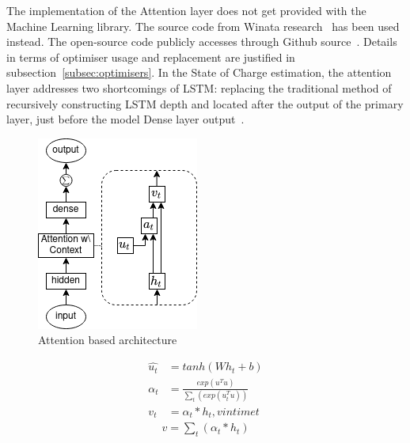 %
%
The implementation of the Attention layer does not get provided with the Machine Learning library.
The source code from Winata research~\cite{winata_attention-based_2018} has been used instead.
The open-source code publicly accesses through Github source~\cite{attention_8461990}.
Details in terms of optimiser usage and replacement are justified in subsection~\ref{subsec:optimisers}.
In the State of Charge estimation, the attention layer addresses two shortcomings of LSTM: replacing the traditional method of recursively constructing LSTM depth and located after the output of the primary layer, just before the model Dense layer output~\cite{mamo_long_2020}.
\begin{figure}[htbp]
    \centering
    \includegraphics[width=0.35\linewidth]{II_Body/LSTM/images/AttenrionDrawing.png}
    \caption{Attention based architecture}
    \label{fig:attention}
\end{figure}
\begin{equation}
    \begin{split}
        \hat{u_t} &= tanh \left(W h_{t} + b \right) \\
             \alpha_t &= \frac{exp(u^T u)}{\sum_t(exp(u_t^T u))} \\
              v_t &= \alpha_t*h_t, v in time t
    \end{split}
    \label{eq:AttentionWithContext}
\end{equation}
\begin{equation}
    \begin{split}
        v = \sum_t(\alpha_t * h_t)
    \end{split}
    \label{eq:Addition}
\end{equation}

